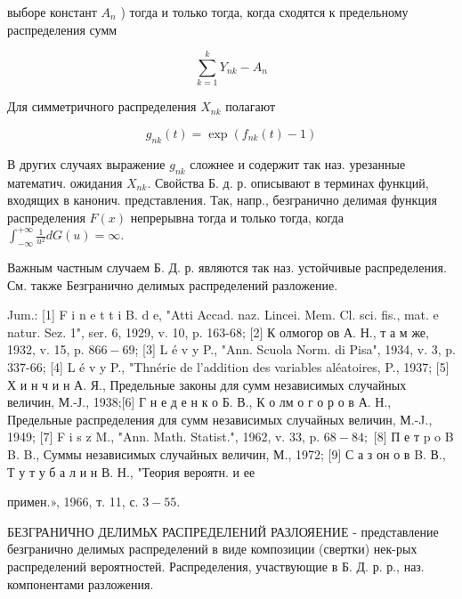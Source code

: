 \documentclass[10pt]{article}
\begin{document}
выборе констант $A_{n}$ ) тогда и только тогда, когда сходятся к предельному распределения сумм



\[

\sum_{k=1}^{k} Y_{n k}-A_{n}

\]



Для симметричного распределения $X_{n k}$ полагают



\[

g_{n k}(t)=\exp \left(f_{n k}(t)-1\right)

\]



В других случаях выражение $g_{n k}$ сложнее и содержит так наз. урезанные математич. ожидания $X_{n k}$. Свойства Б. д. р. описывают в терминах функций, входящих в канонич. представления. Так, напр., безгранично делимая функция распределения $F(x)$ непрерывна тогда и только тогда, когда $\int_{-\infty}^{+\infty} \frac{1}{u^{2}} d G(u)=\infty$.



Важным частным случаем Б. Д. р. являются так наз. устойчивые распределения. См. также Безгранично делимых распределений разложение.



Jum.: [1] F i n e t t i B. d e, "Atti Accad. naz. Lincei. Mem. Cl. sci. fis., mat. e natur. Sez. 1", ser. 6, 1929, v. 10, p. 163-68; [2] К олмогор ов А. Н., т а м же, 1932, v. 15, p. $866-69$; [3] L é v y P., "Ann. Scuola Norm. di Pisa", 1934, v. 3, p. 337-66; [4] L é v y P., "Thnérie de l'addition des variables aléatoires, P., 1937; [5] Х и н ч и н А. Я., Предельные законы для сумм независимых случайных величин, М.-Ј., 1938;[6] Г н е д е н к о Б. В., К о лм о г о р о в А. Н., Предельные распределения для сумм независимых случайных величин, М.-J., 1949; [7] F i s z M., "Ann. Math. Statist.", 1962, v. 33, p. $68-84 ;$ [8] П е т p o B B. B., Суммы независимых случайных величин, М., 1972; [9] С а з он о в B. В., Т у т у б а л и н В. Н., "Теория вероятн. и ее

примен.», 1966, т. 11, с. $3-55$.



БЕЗГРАНИЧНО ДЕЛИМЬХ РАСПРЕДЕЛЕНИЙ РАЗЛОЯЕНИЕ - представление безгранично делимых распределений в виде композиции (свертки) нек-рых распределений вероятностей. Распределения, участвующие в Б. Д. р. р., наз. компонентами разложения.
\end{document}
